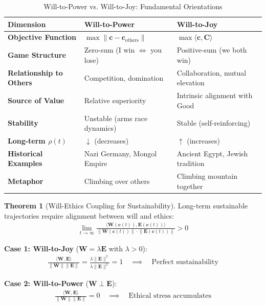 \documentclass[11pt,a4paper]{article}
\theoremstyle{definition}
\newtheorem{theorem}{Theorem}[section]
\theoremstyle{remark}
\newcommand{\EE}{\mathbf{E}}
\newcommand{\WW}{\mathbf{W}}
\newcommand{\cc}{\mathbf{c}}
\newcommand{\norm}[1]{\left\|#1\right\|}
\begin{document}
\begin{enumerate}
\begin{table}[H]
\centering
\caption{Will-to-Power vs. Will-to-Joy: Fundamental Orientations}
\label{tab:will_comparison}
\begin{tabular}{|p{4cm}|p{5cm}|p{5cm}|}
\hline
\textbf{Dimension} & \textbf{Will-to-Power} & \textbf{Will-to-Joy} \\
\hline
\textbf{Objective Function} & \(\max \|\cc - \cc_{\text{others}}\|\) & \(\max \langle \cc, \mathbf{C} \rangle\) \\
\hline
\textbf{Game Structure} & Zero-sum (I win \(\iff\) you lose) & Positive-sum (we both win) \\
\hline
\textbf{Relationship to Others} & Competition, domination & Collaboration, mutual elevation \\
\hline
\textbf{Source of Value} & Relative superiority & Intrinsic alignment with Good \\
\hline
\textbf{Stability} & Unstable (arms race dynamics) & Stable (self-reinforcing) \\
\hline
\textbf{Long-term \(\rho(t)\)} & \(\downarrow\) (decreases) & \(\uparrow\) (increases) \\
\hline
\textbf{Historical Examples} & Nazi Germany, Mongol Empire & Ancient Egypt, Jewish tradition \\
\hline
\textbf{Metaphor} & Climbing over others & Climbing mountain together \\
\hline
\end{tabular}
\end{table}

\begin{theorem}[Will-Ethics Coupling for Sustainability]
Long-term sustainable trajectories require alignment between will and ethics:
\begin{align}
\lim_{t \to \infty} \frac{\langle \WW(\cc(t)), \EE(\cc(t)) \rangle}{\norm{\WW(\cc(t))} \cdot \norm{\EE(\cc(t))}} > 0
\end{align}

\textbf{Case 1: Will-to-Joy} (\(\WW = \lambda \EE\) with \(\lambda > 0\)):
\begin{align}
\frac{\langle \WW, \EE \rangle}{\|\WW\| \|\EE\|} = \frac{\lambda \|\EE\|^2}{\lambda \|\EE\|^2} = 1 \quad \implies \quad \text{Perfect sustainability}
\end{align}

\textbf{Case 2: Will-to-Power} (\(\WW \perp \EE\)):
\begin{align}
\frac{\langle \WW, \EE \rangle}{\|\WW\| \|\EE\|} = 0 \quad \implies \quad \text{Ethical stress accumulates}
\end{align}


\end{theorem}
\end{enumerate}
\end{document}
